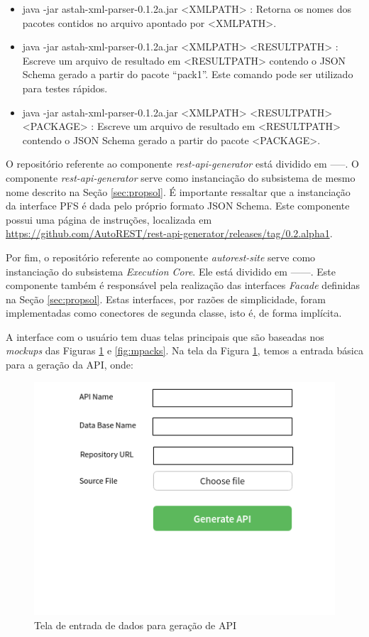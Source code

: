 \begin{itemize}
  \item java -jar astah-xml-parser-0.1.2a.jar <XMLPATH> : Retorna os nomes dos pacotes contidos no arquivo apontado por <XMLPATH>.
  \item java -jar astah-xml-parser-0.1.2a.jar <XMLPATH> <RESULTPATH> : Escreve um arquivo de resultado em <RESULTPATH> contendo o JSON Schema gerado a partir do pacote ``pack1''. Este comando pode ser utilizado para testes rápidos.
  \item java -jar astah-xml-parser-0.1.2a.jar <XMLPATH> <RESULTPATH> <PACKAGE> : Escreve um arquivo de resultado em <RESULTPATH> contendo o JSON Schema gerado a partir do pacote <PACKAGE>.
\end{itemize}

O repositório referente ao componente \textit{rest-api-generator} está dividido em -----. O componente \textit{rest-api-generator} serve como instanciação do subsistema de mesmo nome descrito na Seção \ref{sec:propsol}. É importante ressaltar que a instanciação da interface PFS é dada pelo próprio formato JSON Schema. Este componente possui uma página de instruções, localizada em \url{https://github.com/AutoREST/rest-api-generator/releases/tag/0.2.alpha1}.

Por fim, o repositório referente ao componente \textit{autorest-site} serve como instanciação do subsistema \textit{Execution Core}. Ele está dividido em ------. Este componente também é responsável pela realização das interfaces \textit{Facade} definidas na Seção \ref{sec:propsol}. Estas interfaces, por razões de simplicidade, foram implementadas como conectores de segunda classe, isto é, de forma implícita.

A interface com o usuário tem duas telas principais que são baseadas nos \textit{mockups} das Figuras \ref{fig:mindex} e \ref{fig:mpacks}. Na tela da Figura \ref{fig:mindex}, temos a entrada básica para a geração da API, onde:

\begin{figure}
    \begin{center}
        \includegraphics[scale=0.7]{imagens/Mockup_index.png}
    \end{center}
	\caption{\label{fig:mindex}Tela de entrada de dados para geração de API}
\end{figure}

